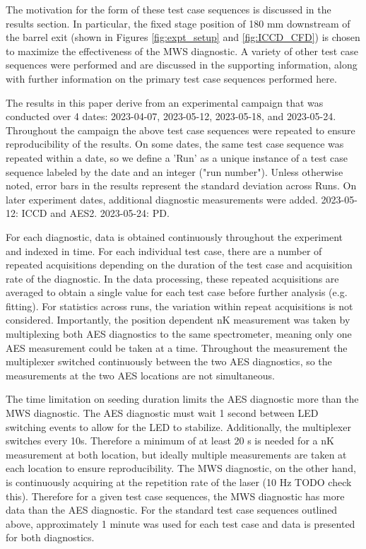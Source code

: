 The motivation for the form of these test case sequences is discussed in the results section. In particular, the fixed stage position of 180 mm downstream of the barrel exit (shown in Figures \ref{fig:expt_setup} and \ref{fig:ICCD_CFD}) is chosen to maximize the effectiveness of the MWS diagnostic. A variety of other test case sequences were performed and are discussed in the supporting information, along with further information on the primary test case sequences performed here. 

The results in this paper derive from an experimental campaign that was conducted over 4 dates: 2023-04-07, 2023-05-12, 2023-05-18, and 2023-05-24. Throughout the campaign the above test case sequences were repeated to ensure reproducibility of the results.  On some dates, the same test case sequence was repeated within a date, so we define a 'Run' as a unique instance of a test case sequence labeled by the date and an integer ("run number").  Unless otherwise noted, error bars in the results represent the standard deviation across Runs. On later experiment dates, additional diagnostic measurements were added. 2023-05-12: ICCD and AES2. 2023-05-24: PD.

For each diagnostic, data is obtained continuously throughout the experiment and indexed in time. For each individual test case, there are a number of repeated acquisitions depending on the duration of the test case and acquisition rate of the diagnostic. In the data processing, these repeated acquisitions are averaged to obtain a single value for each test case before further analysis (e.g. fitting). For statistics across runs, the variation within repeat acquisitions is not considered. Importantly, the position dependent nK measurement was taken by multiplexing both AES diagnostics to the same spectrometer, meaning only one AES measurement could be taken at a time. Throughout the measurement the multiplexer switched continuously between the two AES diagnostics, so the measurements at the two AES locations are not simultaneous. 

The time limitation on seeding duration limits the AES diagnostic more than the MWS diagnostic. The AES diagnostic must wait 1 second between LED switching events to allow for the LED to stabilize. Additionally, the multiplexer switches every 10s. Therefore a minimum of at least 20 s is needed for a nK measurement at both location, but ideally multiple measurements are taken at each location to ensure reproducibility. The MWS diagnostic, on the other hand, is continuously acquiring at the repetition rate of the laser (10 Hz TODO check this). Therefore for a given test case sequences, the MWS diagnostic has more data than the AES diagnostic. For the standard test case sequences outlined above, approximately 1 minute was used for each test case and data is presented for both diagnostics.  

